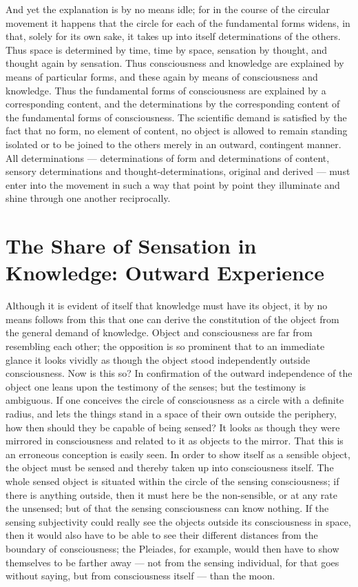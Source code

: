 \documentclass[12pt]{book}
\begin{document}
And yet the explanation is by no means idle; for in the course of the
circular movement it happens that the circle for each of the fundamental
forms widens, in that, solely for its own sake, it takes up into itself
determinations of the others. Thus space is determined by time, time by
space, sensation by thought, and thought again by sensation. Thus
consciousness and knowledge are explained by means of particular forms, and
these again by means of consciousness and knowledge. Thus the fundamental
forms of consciousness are explained by a corresponding content, and the
determinations by the corresponding content of the fundamental forms of
consciousness. The scientific demand is satisfied by the fact that no form,
no element of content, no object is allowed to remain standing isolated or to
be joined to the others merely in an outward, contingent manner. All
determinations --- determinations of form and determinations of content,
sensory determinations and thought-determinations, original and derived ---
must enter into the movement in such a way that point by point they
illuminate and shine through one another reciprocally.

\section{The Share of Sensation in Knowledge: Outward Experience}
\label{sec:2}

\noindent Although it is evident of itself that knowledge must have its
object, it by no means follows from this that one can derive the constitution
of the object from the general demand of knowledge. Object and consciousness
are far from resembling each other; the opposition is so prominent that to an
immediate glance it looks vividly as though the object stood independently
outside consciousness. Now is this so? In confirmation of the outward
independence of the object one leans upon the testimony of the senses; but
the testimony is ambiguous. If one conceives the circle of consciousness as a
circle with a definite radius, and lets the things stand in a space of their
own outside the periphery, how then should they be capable of being sensed?
It looks as though they were mirrored in consciousness and related to it as
objects to the mirror. That this is an erroneous conception is easily seen. In
order to show itself as a sensible object, the object must be sensed and
thereby taken up into consciousness itself. The whole sensed object is
situated within the circle of the sensing consciousness; if there is anything
outside, then it must here be the non-sensible, or at any rate the unsensed;
but of that the sensing consciousness can know nothing. If the sensing
subjectivity could really see the objects outside its consciousness in space,
then it would also have to be able to see their different distances from the
boundary of consciousness; the Pleiades, for example, would then have to show
themselves to be farther away --- not from the sensing individual, for that
goes without saying, but from consciousness itself --- than the moon.
\end{document}
